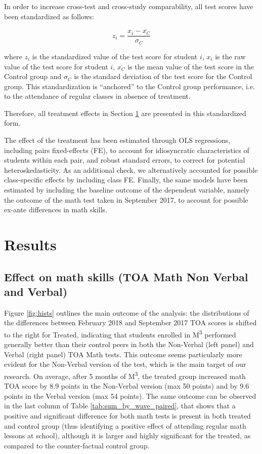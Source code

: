 \documentclass[ 12 pt]{article}
\begin{document}
In order to increase cross-test and cross-study comparability, all test scores have been standardized as follows:

\begin{displaymath}
z_{i}=\frac{x_{i}-\overline{x_{C}}}{\sigma_{C}}
\end{displaymath}

where $z_{i}$ is the standardized value of the test score for student $i$, $x_{i}$ is the raw value of the test score for student $i$, $\overline{x_{C}}$ is the mean value of the test score in the Control group and $\sigma_{C}$ is the standard deviation of the test score for the Control group. This standardization is \enquote{anchored} to the Control group performance, i.e. to the attendance of regular classes in absence of treatment.

Therefore, all treatment effects in Section \ref{sec:results} are presented in this standardized form.  

The effect of the treatment has been estimated through OLS regressions, including pairs fixed-effects (FE), to account for idiosyncratic characteristics of students within each pair, and robust standard errors, to correct for potential heteroskedasticity. As an additional check, we alternatively accounted for possible class-specific effects by including class FE. Finally, the same models have been estimated by including the baseline outcome of the dependent variable, namely the outcome of the math test taken in September 2017, to account for possible ex-ante differences in math skills. 

\section{Results}
\label{sec:results}
\subsection{Effect on math skills (TOA Math Non Verbal and Verbal)}
Figure \ref{fig:hists} outlines the main outcome of the analysis: the distributions of the differences between February 2018 and September 2017 TOA scores is shifted to the right for Treated, indicating that students enrolled in M\textsuperscript{3} performed generally better than their control peers in both the Non-Verbal (left panel) and Verbal (right panel) TOA Math tests. This outcome seems particularly more evident for the Non-Verbal version of the test, which is the main target of our research. On average, after 5 months of M\textsuperscript{3}, the treated group increased math TOA score by 8.9 points in the Non-Verbal version (max 50 points) and by 9.6 points in the Verbal version (max 54 points).
The same outcome can be observed in the last column of Table \ref{tab:sum_by_wave_paired}, that shows that a positive and significant difference for both math tests is present in both treated and control group (thus identifying a positive effect of attending regular math lessons at school), although it is larger and highly significant for the treated, as compared to the counter-factual control group.
\end{document}
